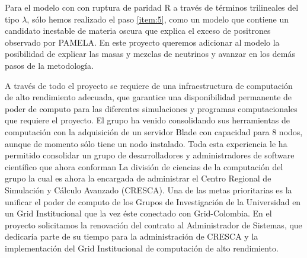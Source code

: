 \begin{proyecto}
  Para el modelo con con ruptura de paridad R a través de términos
  trilineales del tipo $\lambda$, sólo hemos realizado el paso
  \ref{item:5}, como un modelo que contiene un candidato inestable de
  materia oscura que explica el exceso de positrones observado por
  PAMELA. En este proyecto queremos adicionar al modelo la posibilidad
  de explicar las masas y mezclas de neutrinos y avanzar en los demás
  pasos de la metodología.
\end{proyecto}

A través de todo el proyecto se requiere de una infraestructura de
computación de alto rendimiento adecuada, que garantice una
disponibilidad permanente de poder de computo para las diferentes
simulaciones y programas computacionales que requiere el proyecto. El
grupo ha venido consolidando sus herramientas de computación con la
adquisición de un servidor Blade con capacidad para 8 nodos, aunque de
momento sólo tiene un nodo instalado. Toda esta experiencia le ha
permitido consolidar un grupo de desarrolladores y administradores de
software científico que ahora conforman La división de ciencias de la
computación del grupo la cual es ahora la encargada de administrar el
Centro Regional de Simulación y Cálculo Avanzado (CRESCA).  Una de las
metas prioritarias es la unificar el poder de computo de los Grupos de
Investigación de la Universidad en un Grid Institucional que la vez
éste conectado con Grid-Colombia. En el proyecto solicitamos la
renovación del contrato al Administrador de Sistemas, que dedicaría
parte de su tiempo para la administración de CRESCA y la
implementación del Grid Institucional de computación de alto
rendimiento.

